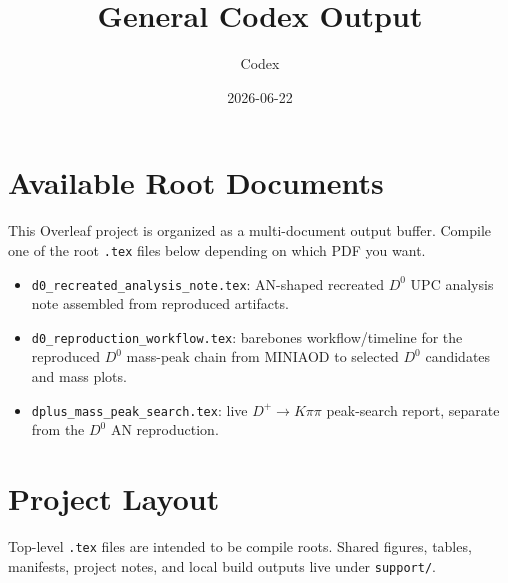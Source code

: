 \documentclass[11pt]{article}
\title{General Codex Output}
\author{Codex}
\date{2026-06-22}
\begin{document}
\maketitle

\section*{Available Root Documents}

This Overleaf project is organized as a multi-document output buffer. Compile
one of the root \texttt{.tex} files below depending on which PDF you want.

\begin{itemize}
\item \texttt{d0\_recreated\_analysis\_note.tex}: AN-shaped recreated
\(D^0\) UPC analysis note assembled from reproduced artifacts.
\item \texttt{d0\_reproduction\_workflow.tex}: barebones workflow/timeline for
the reproduced \(D^0\) mass-peak chain from MINIAOD to selected \(D^0\)
candidates and mass plots.
\item \texttt{dplus\_mass\_peak\_search.tex}: live \(D^+ \to K\pi\pi\)
peak-search report, separate from the \(D^0\) AN reproduction.
\end{itemize}

\section*{Project Layout}

Top-level \texttt{.tex} files are intended to be compile roots. Shared figures,
tables, manifests, project notes, and local build outputs live under
\texttt{support/}.
\end{document}
